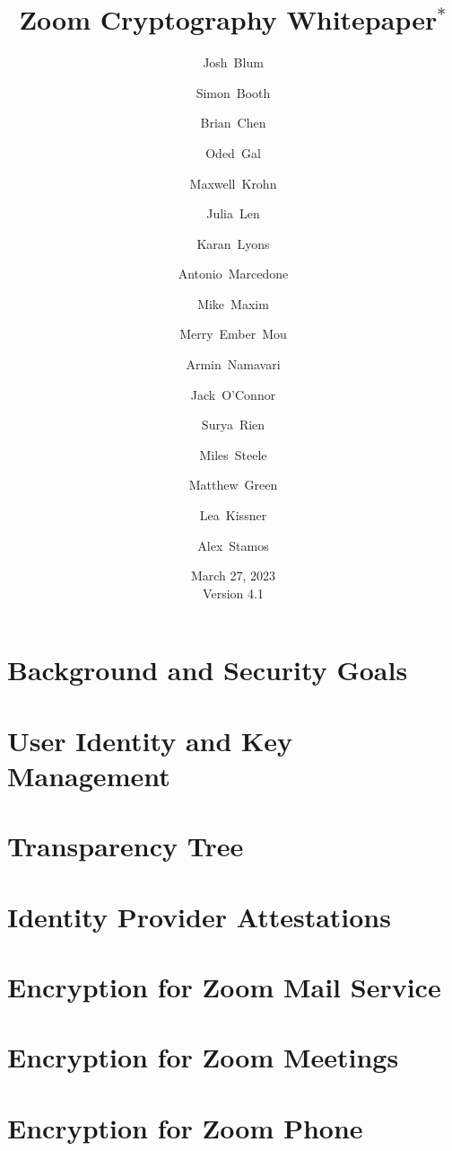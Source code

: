\documentclass[11pt]{article}
\title{Zoom Cryptography Whitepaper$^*$}
\author[1]{\small Josh~Blum}
\author[1]{\small Simon~Booth}
\author[1]{\small Brian~Chen}
\author[1]{\small Oded~Gal}
\author[1]{\small Maxwell~Krohn}
\author[1]{\small Julia~Len}
\author[1]{\small Karan~Lyons}
\author[1]{\small Antonio~Marcedone}
\author[1]{\small Mike~Maxim}
\author[1]{\small Merry~Ember~Mou}
\author[1]{\small Armin~Namavari}
\author[1]{\small Jack~O'Connor}
\author[1]{\small Surya~Rien}
\author[1]{\small Miles~Steele}
\author[2]{\small Matthew~Green}
\author[  \hspace{-1ex}]{\small Lea~Kissner}
\author[3]{\small Alex~Stamos}
\affil[1]{\footnotesize Zoom~Video~Communications}
\affil[2]{\footnotesize Johns~Hopkins~University}
\affil[3]{\footnotesize Stanford~University}
\date{March 27, 2023 \\ \small Version 4.1}
\begin{document}
    \null  %
    \nointerlineskip  %
    \vfill
    \let\snewpage \newpage
    \let\newpage \relax
    \maketitle
    \thispagestyle{titlepage}
    \let \newpage \snewpage
    \vfill
    \break %

    \tableofcontents
    \newpage
    \renewcommand{\thesection}{\arabic{section}}
    \renewcommand{\thesubsection}{\thesection.\arabic{subsection}}
    

    \section{Background and Security Goals}\label{sec:background_and_goals}
    
    \section{User Identity and Key Management}
    
    \section{Transparency Tree}\label{sec:ztt}
    
    \section{Identity Provider Attestations}\label{sec:idpattestations}
    

    \section{Encryption for Zoom Mail Service}\label{sec:email}
    
    \section{Encryption for Zoom Meetings}\label{sec:meetings}
    
    \section{Encryption for Zoom Phone}\label{sec:phone}
    
    
    \pagebreak
    
    \newpage
    \appendix
    
    
    
\end{document}
